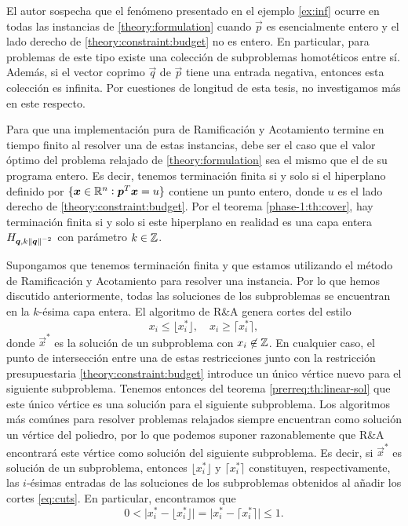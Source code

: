El autor sospecha que el fenómeno presentado en el ejemplo \ref{ex:inf} ocurre en todas las
instancias de \eqref{theory:formulation} cuando $\vec{p}$ es esencialmente entero y el lado derecho
de \eqref{theory:constraint:budget} no es entero. En particular, para problemas de este tipo existe
una colección de subproblemas homotéticos entre sí. Además, si el vector coprimo $\vec{q}$ de
$\vec{p}$ tiene una entrada negativa, entonces esta colección es infinita. Por cuestiones de
longitud de esta tesis, no investigamos más en este respecto.

Para que una implementación pura de Ramificación y Acotamiento termine en tiempo finito al resolver
una de estas instancias, debe ser el caso que el valor óptimo del problema relajado de
\eqref{theory:formulation} sea el mismo que el de su programa entero. Es decir, tenemos terminación
finita si y solo si el hiperplano definido por
	$\lbrace \boldsymbol{x} \in \mathbb{R}^n \vcentcolon \boldsymbol{p}^T\boldsymbol{x} = u \rbrace$
contiene un punto entero, donde $u$ es el lado derecho de \eqref{theory:constraint:budget}. Por el
teorema \ref{phase-1:th:cover}, hay terminación finita si y solo si este hiperplano en realidad es
una capa entera $H_{\boldsymbol{q}, k\left\lVert \boldsymbol{q} \right\rVert^{-2}}$ con parámetro $k \in \mathbb{Z}$.

Supongamos que tenemos terminación finita y que estamos utilizando el método de Ramificación y
Acotamiento para resolver una instancia. Por lo que hemos discutido anteriormente, todas las
soluciones de los subproblemas se encuentran en la $k$-ésima capa entera. El algoritmo de R\&A
genera cortes del estilo
\begin{equation}
	\label{eq:cuts}
	x_i \leq \big\lfloor x_i^* \big\rfloor,\quad x_i \geq \big\lceil x_i^* \big\rceil,
\end{equation}
donde $\vec{x}^*$ es la solución de un
subproblema con $x_i \not\in \mathbb{Z}$. En cualquier caso, el punto de intersección entre una de estas restricciones junto con
la restricción presupuestaria \eqref{theory:constraint:budget} introduce un único vértice nuevo para
el siguiente subproblema. Tenemos entonces del teorema \ref{prerreq:th:linear-sol} que este único
vértice es una solución para el siguiente subproblema. Los algoritmos más comúnes para resolver
problemas relajados siempre encuentran como solución un vértice del poliedro, por lo que podemos
suponer razonablemente que R\&A encontrará este vértice como solución del siguiente subproblema.
Es decir, si $\vec{x}^*$ es solución de un subproblema, entonces $\big\lfloor x_i^* \big\rfloor$ y
$\big\lceil x_i^* \big\rceil$ constituyen, respectivamente, las $i$-ésimas entradas de las
soluciones de los subproblemas obtenidos al añadir los cortes \eqref{eq:cuts}. En particular, encontramos que
\begin{equation}
	\label{eq:dembound}
	0 <
	\big| x_i^* - \big\lfloor x_i^* \big\rfloor \big| =
	\big| x_i^* - \big\lceil x_i^* \big\rceil \big| \leq 1.
\end{equation}

